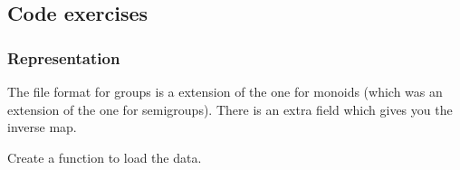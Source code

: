 \subsection{Code exercises}



\subsubsection*{Representation}
The file format for groups is a extension of the one for monoids (which was an extension of the one for semigroups).
There is an extra field  which gives you the inverse map.


\begin{codeexercise}
  Create a function to load the data.
%
\end{codeexercise}


